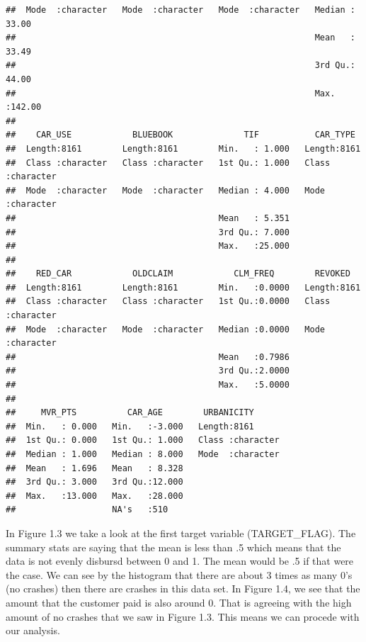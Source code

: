 \documentclass[]{article}
\begin{document}
\begin{verbatim}
##  Mode  :character   Mode  :character   Mode  :character   Median : 33.00  
##                                                           Mean   : 33.49  
##                                                           3rd Qu.: 44.00  
##                                                           Max.   :142.00  
##                                                                           
##    CAR_USE            BLUEBOOK              TIF           CAR_TYPE        
##  Length:8161        Length:8161        Min.   : 1.000   Length:8161       
##  Class :character   Class :character   1st Qu.: 1.000   Class :character  
##  Mode  :character   Mode  :character   Median : 4.000   Mode  :character  
##                                        Mean   : 5.351                     
##                                        3rd Qu.: 7.000                     
##                                        Max.   :25.000                     
##                                                                           
##    RED_CAR            OLDCLAIM            CLM_FREQ        REVOKED         
##  Length:8161        Length:8161        Min.   :0.0000   Length:8161       
##  Class :character   Class :character   1st Qu.:0.0000   Class :character  
##  Mode  :character   Mode  :character   Median :0.0000   Mode  :character  
##                                        Mean   :0.7986                     
##                                        3rd Qu.:2.0000                     
##                                        Max.   :5.0000                     
##                                                                           
##     MVR_PTS          CAR_AGE        URBANICITY       
##  Min.   : 0.000   Min.   :-3.000   Length:8161       
##  1st Qu.: 0.000   1st Qu.: 1.000   Class :character  
##  Median : 1.000   Median : 8.000   Mode  :character  
##  Mean   : 1.696   Mean   : 8.328                     
##  3rd Qu.: 3.000   3rd Qu.:12.000                     
##  Max.   :13.000   Max.   :28.000                     
##                   NA's   :510
\end{verbatim}

In Figure 1.3 we take a look at the first target variable
(TARGET\_FLAG). The summary stats are saying that the mean is less than
.5 which means that the data is not evenly disbursd between 0 and 1. The
mean would be .5 if that were the case. We can see by the histogram that
there are about 3 times as many 0's (no crashes) then there are crashes
in this data set. In Figure 1.4, we see that the amount that the
customer paid is also around 0. That is agreeing with the high amount of
no crashes that we saw in Figure 1.3. This means we can procede with our
analysis.
\end{document}
